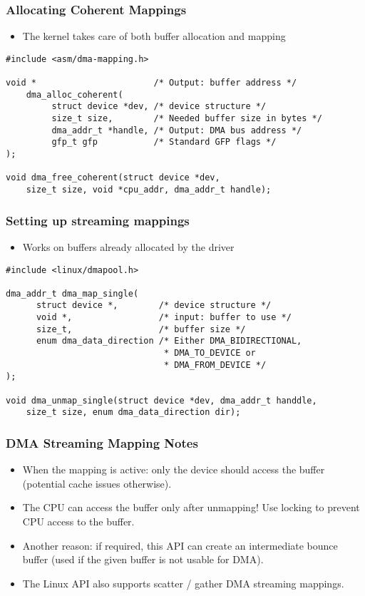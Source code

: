 \begin{frame}[fragile]
  \frametitle{Allocating Coherent Mappings}
  \begin{itemize}
  \item The kernel takes care of both buffer allocation and mapping
  \end{itemize}
\begin{verbatim}
#include <asm/dma-mapping.h>

void *                       /* Output: buffer address */
    dma_alloc_coherent(
         struct device *dev, /* device structure */
         size_t size,        /* Needed buffer size in bytes */
         dma_addr_t *handle, /* Output: DMA bus address */
         gfp_t gfp           /* Standard GFP flags */
);

void dma_free_coherent(struct device *dev,
    size_t size, void *cpu_addr, dma_addr_t handle);
\end{verbatim}
\end{frame}

\begin{frame}[fragile]
  \frametitle{Setting up streaming mappings}
  \begin{itemize}
  \item Works on buffers already allocated by the driver
  \end{itemize}
\begin{verbatim}
#include <linux/dmapool.h>

dma_addr_t dma_map_single(
      struct device *,        /* device structure */
      void *,                 /* input: buffer to use */
      size_t,                 /* buffer size */
      enum dma_data_direction /* Either DMA_BIDIRECTIONAL,
                               * DMA_TO_DEVICE or
                               * DMA_FROM_DEVICE */
);

void dma_unmap_single(struct device *dev, dma_addr_t handdle,
    size_t size, enum dma_data_direction dir);
\end{verbatim}
\end{frame}

\begin{frame}
  \frametitle{DMA Streaming Mapping Notes}
  \begin{itemize}
  \item When the mapping is active: only the device should access the
    buffer (potential cache issues otherwise).
  \item The CPU can access the buffer only after unmapping! Use
    locking to prevent CPU access to the buffer.
  \item Another reason: if required, this API can create an
    intermediate bounce buffer (used if the given buffer is not usable
    for DMA).
  \item The Linux API also supports scatter / gather DMA streaming
    mappings.
  \end{itemize}
\end{frame}
